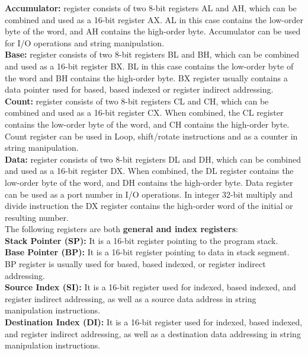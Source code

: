 \documentclass[12pt, a4paper]{scrartcl}
\begin{document}
	\textbf{Accumulator: }register consists of two 8-bit registers AL and AH, which can be combined and used as a 16-bit register AX. AL in this case contains the low-order byte
	of the word, and AH contains the high-order byte.
	Accumulator can be used for I/O operations and string
	manipulation. \\
	
	\textbf{Base: }register consists of two 8-bit registers BL and BH,
	which can be combined and used as a 16-bit
	register BX. BL in this case contains the low-order byte of
	the word and BH contains the high-order byte. BX register
	usually contains a data pointer used for based, based
	indexed or register indirect addressing. \\
	
	\textbf{Count: }register consists of two 8-bit registers CL and CH,
	which can be combined and used as a 16-bit
	register CX. When combined, the CL register contains the
	low-order byte of the word, and CH contains the high-order byte. Count register can be used in Loop, shift/rotate
	instructions and as a counter in string manipulation. \\
	
	\textbf{Data: }register consists of two 8-bit registers DL and DH,	which can be combined and used as a 16-bit
	register DX. When combined, the DL register contains the
	low-order byte of the word, and DH contains the high-order byte. Data register can be used as a port number in
	I/O operations. In integer 32-bit multiply and divide
	instruction the DX register contains the high-order word of the
	initial or resulting number. \\
	
	The following registers are both \textbf{general and index registers}:\\
	
	\textbf{Stack Pointer (SP): }It is a 16-bit register pointing to the program stack. \\
	
	\textbf{Base Pointer (BP): }It is a 16-bit register pointing to data in stack segment. BP register is usually used for based, based indexed, or register indirect addressing. \\
	
	\textbf{Source Index (SI): }It is a 16-bit register used for indexed, based indexed, and register indirect addressing, as well as a source data address in string manipulation instructions.\\ 
	
	\textbf{Destination Index (DI): }It is a 16-bit register used for indexed, based indexed, and register indirect addressing, as well as a destination data addressing in string manipulation instructions.\\
	
\end{document}

